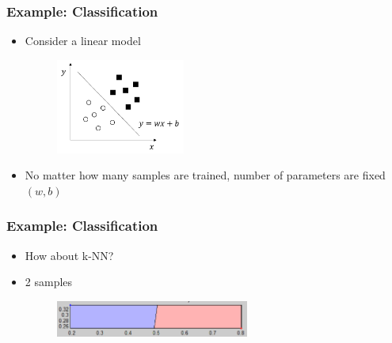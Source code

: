 \documentclass{beamer}
\begin{document}
\begin{frame}
	\frametitle{Example: Classification}
	\begin{itemize}
		\item{Consider a linear model}
		\begin{figure}
			\includegraphics[width=0.4\textwidth]{img/linear.png}
		\end{figure}
		\item{No matter how many samples are trained, number of parameters are fixed $(w,b)$}
	\end{itemize}
\end{frame}

\begin{frame}
	\frametitle{Example: Classification}
	\begin{itemize}
		\item{How about k-NN?}
		\item 2 samples
		\begin{figure}	
		\includegraphics[width=0.6\textwidth]{img/knn2.png}
		\end{figure}
	\end{itemize}
\end{frame}
\end{document}
